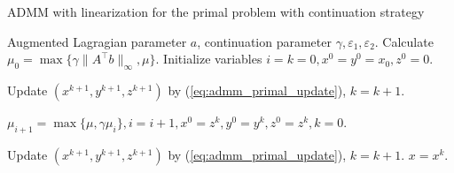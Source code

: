 \documentclass{article}
\numberwithin{equation}{section}
\numberwithin{figure}{section}
\begin{document}
\begin{algorithm}[!htbp]\caption{ADMM with linearization for the primal problem with continuation strategy}\label{alg:alm}
\begin{algorithmic}[1]
 Augmented Lagragian parameter $a$, continuation parameter $\gamma, \varepsilon_1, \varepsilon_2$.
Calculate $\mu_0=\max\{\gamma\|A^\top b\|_\infty,\mu\}$. Initialize variables $i=k=0,x^0=y^0=x_0,z^0=0$.
\item Update $(x^{k+1},y^{k+1},z^{k+1})$ by (\ref{eq:admm_primal_update}), $k = k+1$.
\ENDFOR
\item $\mu_{i+1}=\max\{\mu, \gamma\mu_i\}, i = i+1, x^0=z^k,y^0=y^k,z^0=z^k,k=0$.
\ENDWHILE
{}
\item Update $(x^{k+1},y^{k+1},z^{k+1})$ by (\ref{eq:admm_primal_update}), $k = k+1$.
\ENDFOR
\STATE $x=x^k$.
\end{algorithmic}
\end{algorithm}
\end{document}
